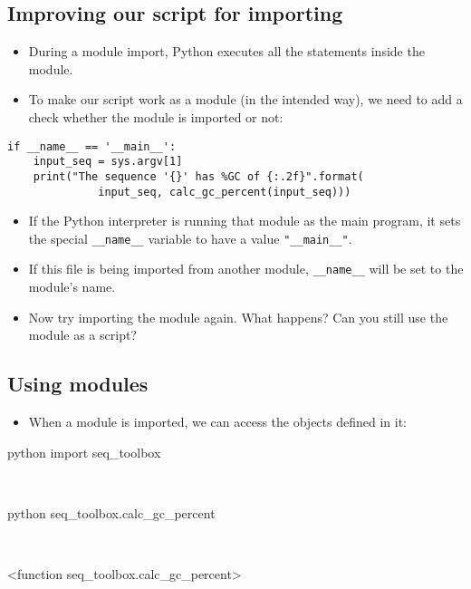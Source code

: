 \documentclass[aspectratio=1610,slidestop]{beamer}
\begin{document}
\subsection{Improving our script for importing}
\begin{pframe}
 \vspace{-.05cm}
 \begin{itemize}
  \item During a module import, Python executes all the statements inside the
  module.
  \item To make our script work as a module (in the intended way), we need to
  add a check whether the module is imported or not:
 \end{itemize}
 \vspace{-0.2cm}
 \begin{pythoncode}
   \begin{verbatim}
if __name__ == '__main__':
    input_seq = sys.argv[1]
    print("The sequence '{}' has %GC of {:.2f}".format(
              input_seq, calc_gc_percent(input_seq)))
   \end{verbatim}
 \end{pythoncode}
 \begin{itemize}
  \item If the Python interpreter is running that module as the main program,
  it sets the special \texttt{__name__} variable to have a value
  \texttt{"__main__"}.
  \item If this file is being imported from another module,
  \texttt{__name__} will be set to the module's name.
  \item Now try importing the module again. What happens? Can you still use the
  module as a script?
 \end{itemize}
\end{pframe}


\subsection{Using modules}
\begin{pframe}
 \begin{itemize}
  \item When a module is imported, we can access the objects defined in it:
 \end{itemize}
 \begin{ipython}
   \begin{pythonin}{python}
import seq_toolbox
   \end{pythonin}
   \\
   \begin{pythonin}{python}
seq_toolbox.calc_gc_percent
   \end{pythonin}
   \\
   \begin{pythonout}
<function seq\_toolbox.calc\_gc\_percent>
   \end{pythonout}
 \end{ipython}
\end{pframe}
\end{document}
